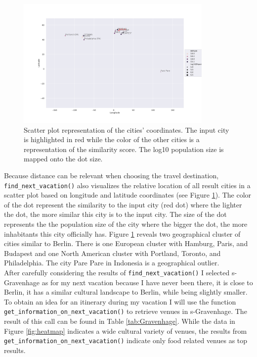 \documentclass[11pt,a4paper,final]{article}
\begin{document}
\begin{figure}[h!]
\begin{center}
\includegraphics[width = 0.85\textwidth]{figures/worldmap_BERLIN.pdf}
\caption{Scatter plot representation of the cities' coordinates. The input city is highlighted in red while the color of the other cities is a representation of the similarity score. The log10 population size is mapped onto the dot size.}\label{fig:worldmap}
\end{center}
\end{figure}

Because distance can be relevant when choosing the travel destination, \texttt{find\_next\_vacation()} also visualizes the relative location of all result cities in a scatter plot based on longitude and latitude coordinates (see Figure \ref{fig:worldmap}). The color of the dot represent the similarity to the input city (red dot) where the lighter the dot, the more similar this city is to the input city. The size of the dot represents the the population size of the city where the bigger the dot, the more inhabitants this city officially has. Figure \ref{fig:worldmap} reveals two geographical cluster of cities similar to Berlin. There is one European cluster with Hamburg, Paris, and Budapest and one North American cluster with Portland, Toronto, and Philadelphia. The city Pare Pare in Indonesia is a geographical outlier. \\

After carefully considering the results of \texttt{find\_next\_vacation()} I selected s-Gravenhage as for my next vacation because I have never been there, it is close to Berlin, it has a similar cultural landscape to Berlin, while being slightly smaller. To obtain an idea for an itinerary during my vacation I will use the function \texttt{get\_information\_on\_next\_vacation()} to retrieve venues in s-Gravenhage. The result of this call can be found in Table \ref{tab:Gravenhage}. While the data in Figure \ref{fig:heatmap} indicates a wide cultural variety of venues, the results from \texttt{get\_information\_on\_next\_vacation()} indicate only food related venues as top results. 
\end{document}
